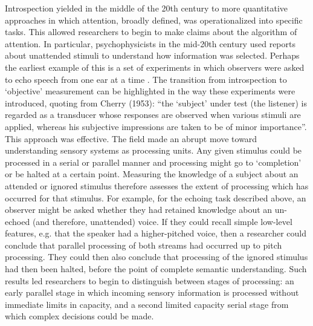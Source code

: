 \documentclass{report}
\begin{document}
Introspection yielded in the middle of the 20th century to more quantitative approaches in which attention, broadly defined, was operationalized into specific tasks. This allowed researchers to begin to make claims about the algorithm of attention. In particular, psychophysicists in the mid-20th century used reports about unattended stimuli to understand how information was selected. Perhaps the earliest example of this is a set of experiments in which observers were asked to echo speech from one ear at a time \cite{Cherry1953-as}. The transition from introspection to ‘objective’ measurement can be highlighted in the way these experiments were introduced, quoting from Cherry (1953): “the ‘subject’ under test (the listener) is regarded as a transducer whose responses are observed when various stimuli are applied, whereas his subjective impressions are taken to be of minor importance”. This approach was effective. The field made an abrupt move toward understanding sensory systems as processing units. Any given stimulus could be processed in a serial or parallel manner and processing might go to ‘completion’ or be halted at a certain point. Measuring the knowledge of a subject about an attended or ignored stimulus therefore assesses the extent of processing which has occurred for that stimulus. For example, for the echoing task described above, an observer might be asked whether they had retained knowledge about an un-echoed (and therefore, unattended) voice. If they could recall simple low-level features, e.g. that the speaker had a higher-pitched voice, then a researcher could conclude that parallel processing  of both streams had occurred up to pitch processing. They could then also conclude that processing of the ignored stimulus had then been halted, before the point of complete semantic understanding. Such results led researchers to begin to distinguish between stages of processing: an early parallel stage in which incoming sensory information is processed without immediate limits in capacity, and a second limited capacity serial stage from which complex decisions could be made.
\end{document}
